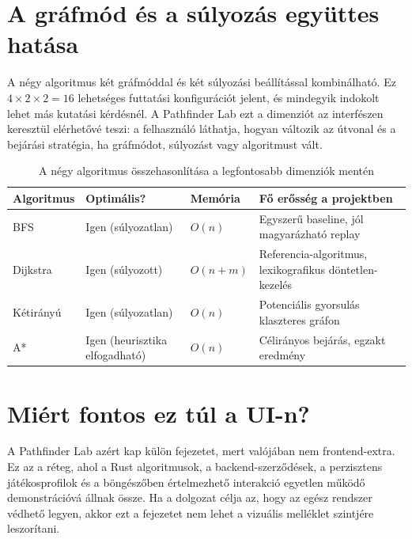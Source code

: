 ﻿\documentclass[a4paper,12pt]{report}
\begin{document}
\section{A gráfmód és a súlyozás együttes hatása}

A négy algoritmus két gráfmóddal és két súlyozási beállítással kombinálható. Ez $4 \times 2 \times 2 = 16$ lehetséges futtatási konfigurációt jelent, és mindegyik indokolt lehet más kutatási kérdésnél. A Pathfinder Lab ezt a dimenziót az interfészen keresztül elérhetővé teszi: a felhasználó láthatja, hogyan változik az útvonal és a bejárási stratégia, ha gráfmódot, súlyozást vagy algoritmust vált.

\begin{table}[H]
\centering
\caption{A négy algoritmus összehasonlítása a legfontosabb dimenziók mentén}
\begin{tabularx}{\textwidth}{>{\raggedright\arraybackslash}p{3cm} >{\raggedright\arraybackslash}p{2.5cm} >{\raggedright\arraybackslash}X >{\raggedright\arraybackslash}X}
\toprule
\textbf{Algoritmus} & \textbf{Optimális?} & \textbf{Memória} & \textbf{Fő erősség a projektben} \\
\midrule
BFS & Igen (súlyozatlan) & $O(n)$ & Egyszerű baseline, jól magyarázható replay \\
Dijkstra & Igen (súlyozott) & $O(n + m)$ & Referencia-algoritmus, lexikografikus döntetlen-kezelés \\
Kétirányú & Igen (súlyozatlan) & $O(n)$ & Potenciális gyorsulás klaszteres gráfon \\
A* & Igen (heurisztika elfogadható) & $O(n)$ & Célirányos bejárás, egzakt eredmény \\
\bottomrule
\end{tabularx}
\end{table}

\section{Miért fontos ez túl a UI-n?}

A Pathfinder Lab azért kap külön fejezetet, mert valójában nem frontend-extra. Ez az a réteg, ahol a Rust algoritmusok, a backend-szerződések, a perzisztens játékosprofilok és a böngészőben értelmezhető interakció egyetlen működő demonstrációvá állnak össze. Ha a dolgozat célja az, hogy az egész rendszer védhető legyen, akkor ezt a fejezetet nem lehet a vizuális melléklet szintjére leszorítani.

\end{document}
